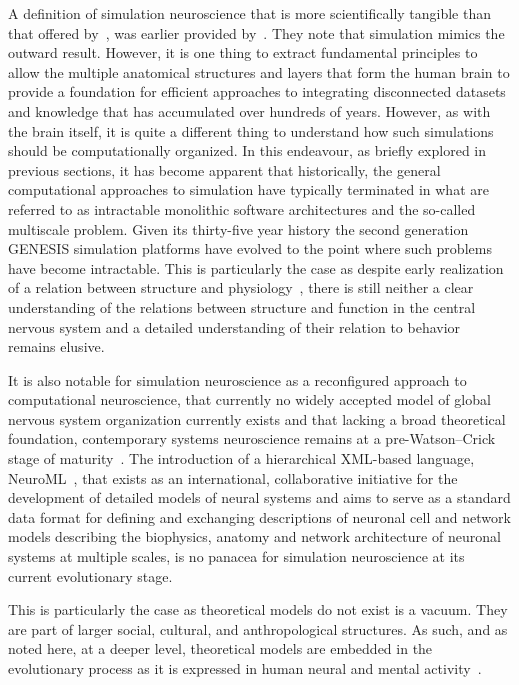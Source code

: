 \documentclass[11pt,3p,twocolumn]{JMN}
\begin{document}
A definition of simulation neuroscience that is more scientifically tangible than that offered by~\citet{fan19}, was earlier provided by~\citet{sandberg08}. They note that simulation mimics the outward result. However, it is one thing to extract fundamental principles to allow the multiple anatomical structures and layers that form the human brain to provide a foundation for efficient approaches to integrating disconnected datasets and knowledge that has accumulated over hundreds of years. However, as with the brain itself, it is quite a different thing to understand how such simulations should be computationally organized. In this endeavour, as briefly explored in previous sections, it has become apparent that historically, the general computational approaches to simulation have typically terminated in what are referred to as intractable monolithic software architectures and the so-called multiscale problem. Given its thirty-five year history the second generation GENESIS simulation platforms have evolved to the point where such problems have become intractable. This is particularly the case as despite early realization of a relation between structure and physiology~\citep[see, for example][]{sieck17}, there is still neither a clear understanding of the relations between structure and function in the central nervous system and a detailed understanding of their relation to behavior remains elusive.

It is also notable for simulation neuroscience as a reconfigured approach to computational neuroscience, that currently no widely accepted model of global nervous system organization currently exists and that lacking a broad theoretical foundation, contemporary systems neuroscience remains at a pre-Watson–Crick stage of maturity~\citep{swanson10}. The introduction of a hierarchical XML-based language, NeuroML~\citep{gleeson10:neuroml}, that exists as an international, collaborative initiative for the development of detailed models of neural systems and aims to serve as a standard data format for defining and exchanging descriptions of neuronal cell and network models describing the biophysics, anatomy and network architecture of neuronal systems at multiple scales, is no panacea for simulation neuroscience at its current evolutionary stage.

This is particularly the case as theoretical models do not exist is a vacuum. They are part of larger social, cultural, and anthropological structures. As such, and as noted here, at a deeper level, theoretical models are embedded in the evolutionary process as it is expressed in human neural and mental activity~\citep{jacobson93}.
\end{document}
